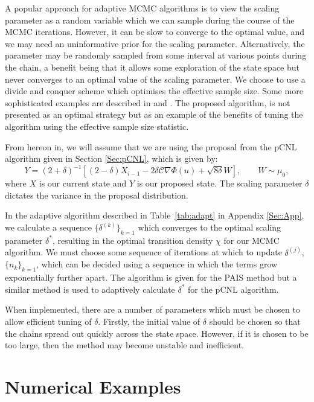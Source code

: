\documentclass[final]{siamltex}
\begin{document}
A popular approach for adaptive MCMC algorithms is to view the scaling
parameter as a random variable which we can sample during the course
of the MCMC iterations. However, it can be slow to converge to the
optimal value, and we may need an
uninformative prior for the scaling parameter. Alternatively, the parameter may be randomly sampled from some interval at various points during the chain, a benefit being that it allows some exploration of the state space but never converges to an optimal value of the scaling parameter. We choose to use a divide and conquer scheme which optimises the effective sample size. Some more sophisticated examples are described in \cite{roberts2009examples} and \cite{Ji2013adaptive}. The proposed algorithm, is not presented as an optimal strategy but as an example of the benefits of tuning the algorithm using the effective sample size statistic.

From hereon in, we will assume that we are using the proposal from the
pCNL algorithm given in Section \ref{Sec:pCNL}, which is given by:
\begin{equation}Y = (2+\delta)^{-1}\left[(2 - \delta)X_{i-1}-
2\delta\mathcal{C}\nabla \Phi(u)+
\sqrt{8\delta} W\right], \qquad W \sim \mu_0,
\end{equation}
where $X$ is our current state and $Y$ is our proposed state. The
scaling parameter $\delta$ dictates the variance in the proposal distribution.

 In the adaptive algorithm described in Table~\ref{tab:adapt} in
 Appendix \ref{Sec:App}, we calculate a sequence $\{\delta^{(k)}\}_{k=1}$ which converges to the optimal scaling parameter $\delta^*$, resulting in the optimal transition density $\chi$ for our MCMC algorithm. We must choose some sequence of iterations at which to update $\delta^{(j)}$, $\{n_k\}_{k=1}$, which can be decided using a sequence in which the terms grow exponentially further apart. The algorithm is given for the PAIS method but a similar method is used to adaptively calculate $\delta^*$ for the pCNL algorithm.

When implemented, there are a number of parameters which must be
chosen to allow efficient tuning of $\delta$. Firstly, the initial
value of $\delta$ should be chosen so that the chains spread out
quickly across the state space. However, if it is chosen to be too
large, then the method may become unstable and inefficient. 

\section{Numerical Examples}\label{Sec:Num}
\end{document}
